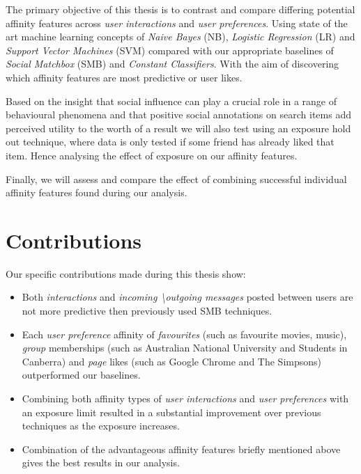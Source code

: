 The primary objective of this thesis is to contrast and compare differing potential affinity features across \emph{user interactions} and 
\emph{user preferences}. Using state of the art machine learning concepts of \emph{Naive Bayes} (NB), \emph{Logistic Regression} (LR) 
and \emph{Support Vector Machines} (SVM) compared with our appropriate baselines of \emph{Social Matchbox} (SMB) and \emph{Constant Classifiers}. 
With the aim of discovering which affinity features are most predictive or user likes.

Based on the insight that social inﬂuence can play a crucial role in a range of behavioural phenomena \cite{grano,watts} and that
positive social annotations on search items add perceived utility to the worth of a result \cite{pantel} we will 
also test using an exposure hold out technique, where data is only tested if some friend has already liked that item. Hence analysing the 
effect of exposure on our affinity features.

Finally, we will assess and compare the effect of combining successful individual affinity features found during our analysis.

\section{Contributions}
\label{sec:contributions}

Our specific contributions made during this thesis show:

\begin{itemize}
\item Both \emph{interactions} and \emph{incoming \textbackslash outgoing messages} posted between users are not more predictive then 
previously used SMB techniques.
\item Each \emph{user preference} affinity of \emph{favourites} (such as favourite movies, music), \emph{group} memberships (such as Australian National University
and Students in Canberra) and \emph{page} likes (such as Google Chrome and The Simpsons) outperformed our baselines.
\item Combining both affinity types of \emph{user interactions} and \emph{user preferences} with an exposure limit resulted in a 
substantial improvement over previous techniques as the exposure increases.
\item Combination of the advantageous affinity features briefly mentioned above gives the best results in our analysis.
\end{itemize} 

